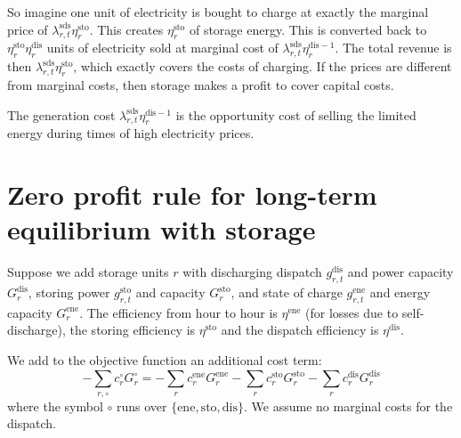 \documentclass[final,3p,times]{elsarticle}
\begin{document}
So imagine one unit of electricity is bought to charge at exactly the marginal price of $\lambda^{\textrm{sds}}_{r,t} \eta^{\textrm{sto}}_r$. This creates $\eta^{\textrm{sto}}_r$ of storage energy. This is converted back to $\eta^{\textrm{sto}}_r\eta^{\textrm{dis}}_r$ units of electricity sold at marginal cost of $\lambda^{\textrm{sds}}_{r,t}\eta^{\textrm{dis}-1}_r $. The total revenue is then $\lambda^{\textrm{sds}}_{r,t} \eta^{\textrm{sto}}_r$, which exactly covers the costs of charging. If the prices are different from marginal costs, then storage makes a profit to cover capital costs.

The generation cost $\lambda^{\textrm{sds}}_{r,t}\eta^{\textrm{dis} -1}_r $ is the opportunity cost of selling the limited energy during times of high electricity prices.


\appendix


\section{Zero profit rule for long-term equilibrium with storage}\label{sec:storage}


Suppose we add storage units $r$ with discharging dispatch $g^{\textrm{dis}}_{r,t}$ and power capacity $G^{\textrm{dis}}_{r}$, storing power $g^{\textrm{sto}}_{r,t}$ and capacity $G^{\textrm{sto}}_{r}$, and state of charge $g^{\textrm{ene}}_{r,t}$ and energy capacity $G^{\textrm{ene}}_{r}$. The efficiency from hour to hour is $\eta^{\textrm{ene}}$ (for losses due to self-discharge), the storing efficiency is $\eta^{\textrm{sto}}$ and the dispatch efficiency is $\eta^{\textrm{dis}}$.

We add to the objective function an additional cost term:
\begin{equation*}
  -\sum_{r,\circ} c^\circ_r G^\circ_r =  -\sum_r c^{\textrm{ene}}_r G^{\textrm{ene}}_r -\sum_r c^{\textrm{sto}}_r G^{\textrm{sto}}_r -\sum_r c^{\textrm{dis}}_r G^{\textrm{dis}}_r
\end{equation*}
where the symbol $\circ$ runs over $\{\textrm{ene},\textrm{sto},\textrm{dis}\}$. We assume no marginal costs for the dispatch.
\end{document}
